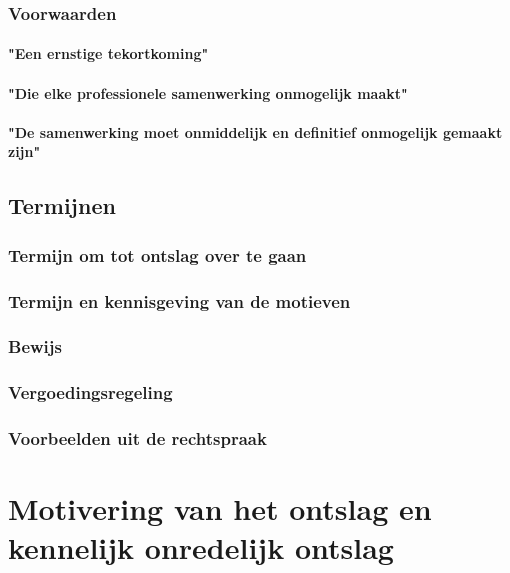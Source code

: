 \subsubsection{Voorwaarden}

\paragraph{"Een ernstige tekortkoming"}

\paragraph{"Die elke professionele samenwerking onmogelijk maakt"}

\paragraph{"De samenwerking moet onmiddelijk en definitief onmogelijk gemaakt zijn"}

\subsection{Termijnen}

\subsubsection{Termijn om tot ontslag over te gaan}

\subsubsection{Termijn en kennisgeving van de motieven}

\subsubsection{Bewijs}

\subsubsection{Vergoedingsregeling}

\subsubsection{Voorbeelden uit de rechtspraak}

\section{Motivering van het ontslag en kennelijk onredelijk ontslag}

